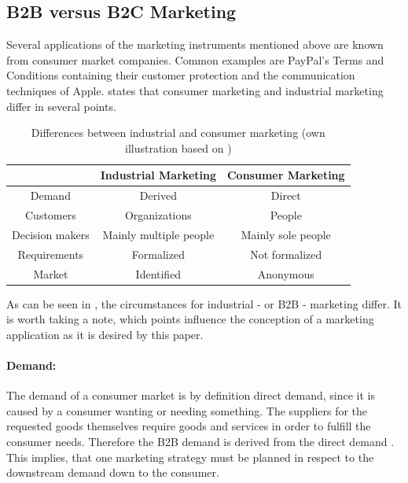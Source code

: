 \subsection{B2B versus B2C Marketing}\label{ssec:b2b}

Several applications of the marketing instruments mentioned above are known from consumer market companies. Common examples are PayPal's Terms and Conditions containing their customer protection \parencite[see][]{PayPal} and the communication techniques of Apple. \textcite[20-21]{Backhaus.2015b} states that consumer marketing and industrial marketing differ in several points.


\begin{table}[H]
\begin{center}
\begin{tabular}{|c|c|c|}
\hline 
 & Industrial Marketing & Consumer Marketing \\ 
\hline 
Demand & Derived & Direct \\ 
\hline 
Customers & Organizations & People \\ 
\hline 
Decision makers & Mainly multiple people & Mainly sole people \\ 
\hline 
Requirements & Formalized & Not formalized \\ 
\hline 
Market & Identified & Anonymous \\ 
\hline 
\end{tabular} 
\end{center}
\caption[Differences between industrial and consumer marketing]{Differences between industrial and consumer marketing (own illustration based on \protect\cite[21]{Backhaus.2015b})}
\label{tab:marketingdiff}
\end{table}


As can be seen in , the circumstances for industrial - or B2B - marketing differ. It is worth taking a note, which points influence the conception of a marketing application as it is desired by this paper. 

\paragraph*{Demand:} 
The demand of a consumer market is by definition direct demand, since it is caused by a consumer wanting or needing something. The suppliers for the requested goods themselves require goods and services in order to fulfill the consumer needs. Therefore the B2B demand is derived from the direct demand \parencite[cf.][21]{Backhaus.2015b}. This implies, that one marketing strategy must be planned in respect to the downstream demand down to the consumer. 


